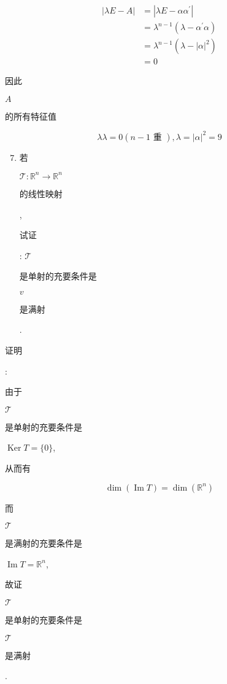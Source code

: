 \documentclass[10pt]{article}
\begin{document}
$$
\begin{aligned}
|\lambda E-A| &=\left|\lambda E-\alpha \alpha^{\prime}\right| \\
&=\lambda^{n-1}\left(\lambda-\alpha^{\prime} \alpha\right) \\
&=\lambda^{n-1}\left(\lambda-|\alpha|^{2}\right) \\
&=0
\end{aligned}
$$
\begin{CJK}{UTF8}{mj}因此\end{CJK} $A$ \begin{CJK}{UTF8}{mj}的所有特征值\end{CJK}
$$
\lambda \lambda=0(n-1 \text { 重 }), \lambda=|\alpha|^{2}=9
$$

\begin{enumerate}
  \setcounter{enumi}{6}
  \item \begin{CJK}{UTF8}{mj}若\end{CJK} $\mathscr{T}: \mathbb{R}^{n} \rightarrow \mathbb{R}^{n}$ \begin{CJK}{UTF8}{mj}的线性映射\end{CJK}, \begin{CJK}{UTF8}{mj}试证\end{CJK}: $\mathscr{T}$ \begin{CJK}{UTF8}{mj}是单射的充要条件是\end{CJK} $v$ \begin{CJK}{UTF8}{mj}是满射\end{CJK}.
\end{enumerate}
\begin{CJK}{UTF8}{mj}证明\end{CJK}: \begin{CJK}{UTF8}{mj}由于\end{CJK} $\mathscr{T}$ \begin{CJK}{UTF8}{mj}是单射的充要条件是\end{CJK} $\operatorname{Ker} T=\{0\}$, \begin{CJK}{UTF8}{mj}从而有\end{CJK}
$$
\operatorname{dim}(\operatorname{Im} T)=\operatorname{dim}\left(\mathbb{R}^{n}\right)
$$
\begin{CJK}{UTF8}{mj}而\end{CJK} $\mathscr{T}$ \begin{CJK}{UTF8}{mj}是满射的充要条件是\end{CJK} $\operatorname{Im} T=\mathbb{R}^{n}$, \begin{CJK}{UTF8}{mj}故证\end{CJK} $\mathscr{T}$ \begin{CJK}{UTF8}{mj}是单射的充要条件是\end{CJK} $\mathscr{T}$ \begin{CJK}{UTF8}{mj}是满射\end{CJK}.
\end{document}

